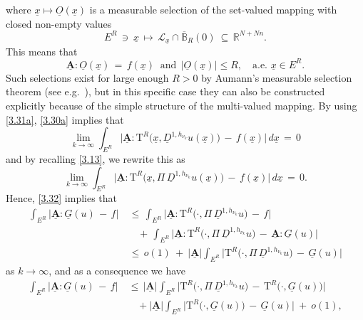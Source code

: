 \documentclass{amsart}
\theoremstyle{definition}
\numberwithin{equation}{section}
\begin{document}
where $\underline{x} \mapsto \underline{O}(\underline{x} )$ is a measurable selection of the set-valued mapping with closed non-empty values
\[
E^R \, \ni\ \underline{x} \, {\longmapsto} \,\mathscr{L}_{\underline{x}} \cap \overline{\mathbb{B}}_R(0) \ {\subseteq} \, {\mathbb{R}}^{N+Nn}.
\]
This means that 
\[
{\underline{\textbf{A}}} {\!:\!} \underline{O}(\underline{x})\,=\, f (\underline{x}) \ \text{ and} \ \ \big| \underline{O}(\underline{x})\big|\leq R, \ \ \ \text{ a.e.\ }\underline{x}\in E^R.
\]
Such selections exist for large enough $R>0$ by Aumann's measurable selection theorem (see e.g.\ \cite{FL}), but in this specific case they can also be constructed explicitly because of the simple structure of the multi-valued mapping. By using 
\eqref{3.31a}, \eqref{3.30a} implies that
\[
\lim_{k{\rightarrow} \infty} \int_{E^R }  \Big|  {\underline{\textbf{A}}} : \text{T}^R\big(\underline{x},{\underline{D}}^{1,h_{\nu_k}}u(\underline{x})\big)\,-\, f (\underline{x}) \Big|\,d\underline{x}\, =\, 0 
\]
and by recalling \eqref{3.13}, we rewrite this as
\begin{equation}   \label{3.32}
\lim_{k{\rightarrow} \infty} \int_{E^R }  \Big|  {\underline{\textbf{A}}} : \text{T}^R\Big(\underline{x},\Pi\, {\underline{D}}^{1,h_{\nu_k}}u(\underline{x})\Big)\,-\, f (\underline{x}) \Big|\,d\underline{x}\, =\, 0.
\end{equation}
Hence, \eqref{3.32} implies that
\[
\begin{split}
\int_{E^R }  \Big|  {\underline{\textbf{A}}} : \underline{G}(u) \,-\, f  \Big| \
&\leq \, \int_{E^R }  \Big|  {\underline{\textbf{A}}} : \text{T}^R\Big(\cdot,\Pi\,   {\underline{D}}^{1,h_{\nu_k}}u \Big)\,-\, f   \Big|  \\ 
&\ \ \ \ + \,\int_{E^R }  \Big|  {\underline{\textbf{A}}} : \text{T}^R\Big(\cdot,\Pi\, {\underline{D}}^{1,h_{\nu_k}}u \Big)\,-\,  {\underline{\textbf{A}}} : \underline{G}(u)  \Big|  \\
& \leq \, o(1)\ +\ |{\underline{\textbf{A}}} |\int_{E^R }  \Big|   \text{T}^R\Big(\cdot,\Pi\, {\underline{D}}^{1,h_{\nu_k}}u \Big)\,-\,  \underline{G}(u) \Big| 
\end{split}
\]
as $k{\rightarrow} \infty$, and as a consequence we have
\begin{equation}      \label{3.33}
\begin{split}
\int_{E^R }  \Big|  {\underline{\textbf{A}}} : \underline{G}(u) \,-\, f  \Big| \
& \leq \,  |{\underline{\textbf{A}}} |\int_{E^R }  \Big|   \text{T}^R\Big(\cdot,\Pi\, {\underline{D}}^{1,h_{\nu_k}}u \Big)\,-\, \text{T}^R\big(\cdot,\underline{G}(u)\big) \Big|  \\
&\ \ \ \ + |{\underline{\textbf{A}}} |\int_{E^R }  \Big|   \text{T}^R\big(\cdot,\underline{G}(u)  \big)\,-\,  \underline{G}(u) \Big|\ +\ o(1),
\end{split}
\end{equation}
\end{document}
